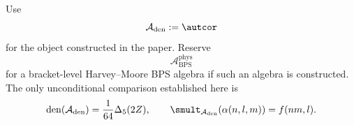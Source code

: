 \begin{remark}
Use
$$
\mathcal A_{\mathrm{den}}:=\autcor
$$
for the object constructed in the paper.  Reserve
$$
\mathcal A_{\mathrm{BPS}}^{\mathrm{phys}}
$$
for a bracket-level Harvey--Moore BPS algebra if such an algebra is
constructed.  The only unconditional comparison established here is
$$
\operatorname{den}(\mathcal A_{\mathrm{den}})
=\frac1{64}\Delta_5(2Z),
\qquad
\smult_{\mathcal A_{\mathrm{den}}}(\alpha(n,l,m))=f(nm,l).
$$
\end{remark}
